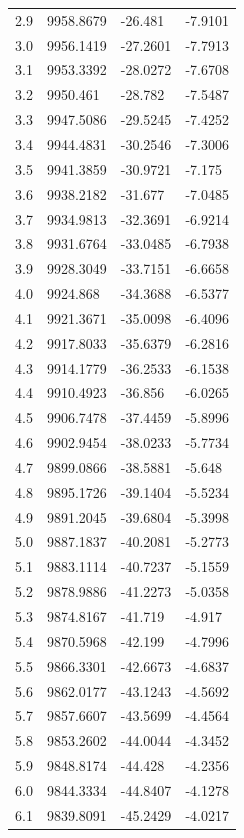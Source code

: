 \begin{table}[H]
\begin{tabular}{llll}
2.9 & 9958.8679 & -26.481 & -7.9101 \\
3.0 & 9956.1419 & -27.2601 & -7.7913 \\
3.1 & 9953.3392 & -28.0272 & -7.6708 \\
3.2 & 9950.461 & -28.782 & -7.5487 \\
3.3 & 9947.5086 & -29.5245 & -7.4252 \\
3.4 & 9944.4831 & -30.2546 & -7.3006 \\
3.5 & 9941.3859 & -30.9721 & -7.175 \\
3.6 & 9938.2182 & -31.677 & -7.0485 \\
3.7 & 9934.9813 & -32.3691 & -6.9214 \\
3.8 & 9931.6764 & -33.0485 & -6.7938 \\
3.9 & 9928.3049 & -33.7151 & -6.6658 \\
4.0 & 9924.868 & -34.3688 & -6.5377 \\
4.1 & 9921.3671 & -35.0098 & -6.4096 \\
4.2 & 9917.8033 & -35.6379 & -6.2816 \\
4.3 & 9914.1779 & -36.2533 & -6.1538 \\
4.4 & 9910.4923 & -36.856 & -6.0265 \\
4.5 & 9906.7478 & -37.4459 & -5.8996 \\
4.6 & 9902.9454 & -38.0233 & -5.7734 \\
4.7 & 9899.0866 & -38.5881 & -5.648 \\
4.8 & 9895.1726 & -39.1404 & -5.5234 \\
4.9 & 9891.2045 & -39.6804 & -5.3998 \\
5.0 & 9887.1837 & -40.2081 & -5.2773 \\
5.1 & 9883.1114 & -40.7237 & -5.1559 \\
5.2 & 9878.9886 & -41.2273 & -5.0358 \\
5.3 & 9874.8167 & -41.719 & -4.917 \\
5.4 & 9870.5968 & -42.199 & -4.7996 \\
5.5 & 9866.3301 & -42.6673 & -4.6837 \\
5.6 & 9862.0177 & -43.1243 & -4.5692 \\
5.7 & 9857.6607 & -43.5699 & -4.4564 \\
5.8 & 9853.2602 & -44.0044 & -4.3452 \\
5.9 & 9848.8174 & -44.428 & -4.2356 \\
6.0 & 9844.3334 & -44.8407 & -4.1278 \\
6.1 & 9839.8091 & -45.2429 & -4.0217 \\

\end{tabular}
\end{table}
